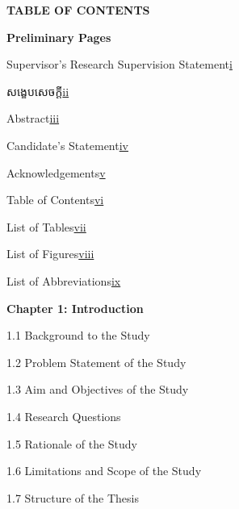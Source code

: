 \begin{adjustwidth}{0.2cm}{0.2cm}

    \begin{center}
        {\englishfont\fontsize{14pt}{21pt}\selectfont \textbf{TABLE OF CONTENTS} \par}
    \end{center}
    \label{toc}

    \vspace{1cm}
    \setlength{\parindent}{0pt}
    {\large \textbf{Preliminary Pages}\par}
    \vspace{0.3cm}
    {\large Supervisor's Research Supervision Statement\dotfill\hyperref[supervisor-statement]{i}\par}
    {\khmernormal\fontsize{11pt}{16pt}\selectfont សង្ខេបសេចក្ដី\dotfill\hyperref[khmer-abstract]{ii}\par}
    {\large Abstract\dotfill\hyperref[abstract]{iii}\par}
    {\large Candidate's Statement\dotfill\hyperref[candidate-statement]{iv}\par}
    {\large Acknowledgements\dotfill\hyperref[acknowledgements]{v}\par}
    {\large Table of Contents\dotfill\hyperref[toc]{vi}\par}
    {\large List of Tables\dotfill\hyperref[lot]{vii}\par}
    {\large List of Figures\dotfill\hyperref[lof]{viii}\par}
    {\large List of Abbreviations\dotfill\hyperref[loa]{ix}\par}

    \vspace{0.5cm}
    {\large \textbf{Chapter 1: Introduction}\dotfill\pageref{ch:intro}\par}
    {\large 1.1 Background to the Study\dotfill\pageref{sec:background}\par}
    {\large 1.2 Problem Statement of the Study\dotfill\pageref{sec:problem}\par}
    {\large 1.3 Aim and Objectives of the Study\dotfill\pageref{sec:objectives}\par}
    {\large 1.4 Research Questions\dotfill\pageref{sec:questions}\par}
    {\large 1.5 Rationale of the Study\dotfill\pageref{sec:rationale}\par}
    {\large 1.6 Limitations and Scope of the Study\dotfill\pageref{sec:limitations}\par}
    {\large 1.7 Structure of the Thesis\dotfill\pageref{sec:structure}\par}


\end{adjustwidth}
